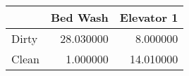 \begin{tabular}{lrr}
\toprule
 & Bed Wash & Elevator 1 \\
\midrule
Dirty & 28.030000 & 8.000000 \\
Clean & 1.000000 & 14.010000 \\
\bottomrule
\end{tabular}
